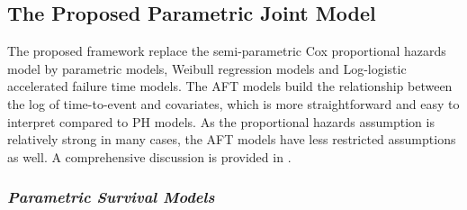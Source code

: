 \subsection{The Proposed Parametric Joint Model}

The proposed framework replace the semi-parametric Cox proportional hazards model by parametric models, Weibull regression models and Log-logistic accelerated failure time models. 
The AFT models build the relationship between the log of time-to-event and covariates, which is more straightforward and easy to interpret compared to PH models. As the proportional hazards assumption is relatively strong in many cases, the AFT models have less restricted assumptions as well.
A comprehensive discussion is provided in \cite{wang2006estimation}.

\subsubsection*{\textit{Parametric Survival Models}}

